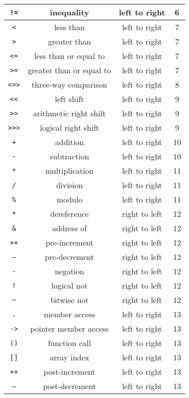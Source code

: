 \documentclass[letterpaper,12pt]{book}
\begin{document}
\begin{longtable}{|c|c|c|c|}
\texttt{!=} & inequality & left to right & 6\\
\hline
\texttt{<} & less than & left to right & 7\\
\hline
\texttt{>} & greater than & left to right & 7\\
\hline
\texttt{<=} & less than or equal to & left to right & 7\\
\hline
\texttt{>=} & greater than or equal to & left to right & 7\\
\hline
\texttt{<=>} & three-way comparison & left to right & 8\\
\hline
\texttt{<<} & left shift & left to right & 9\\
\hline
\texttt{>>} & arithmetic right shift & left to right & 9\\
\hline
\texttt{>>>} & logical right shift & left to right & 9\\
\hline
\texttt{+} & addition & left to right & 10\\
\hline
\texttt{-} & subtraction & left to right & 10\\
\hline
\texttt{*} & multiplication & left to right & 11\\
\hline
\texttt{/} & division & left to right & 11\\
\hline
\texttt{\%} & modulo & left to right & 11\\
\hline
\texttt{*} & dereference & right to left & 12\\
\hline
\texttt{\&} & address of & right to left & 12\\
\hline
\texttt{++} & pre-increment & right to left & 12\\
\hline
\texttt{--} & pre-decrement & right to left & 12\\
\hline
\texttt{-} & negation & right to left & 12\\
\hline
\texttt{!} & logical not & right to left & 12\\
\hline
\texttt{\~{}} & bitwise not & right to left & 12\\
\hline
\texttt{.} & member access & left to right & 13\\
\hline
\texttt{->} & pointer member access & left to right & 13\\
\hline
\texttt{()} & function call & left to right & 13\\
\hline
\texttt{[]} & array index & left to right & 13\\
\hline
\texttt{++} & post-increment & left to right & 13\\
\hline
\texttt{--} & post-decrement & left to right & 13\\
\hline
\end{longtable}
\end{document}
